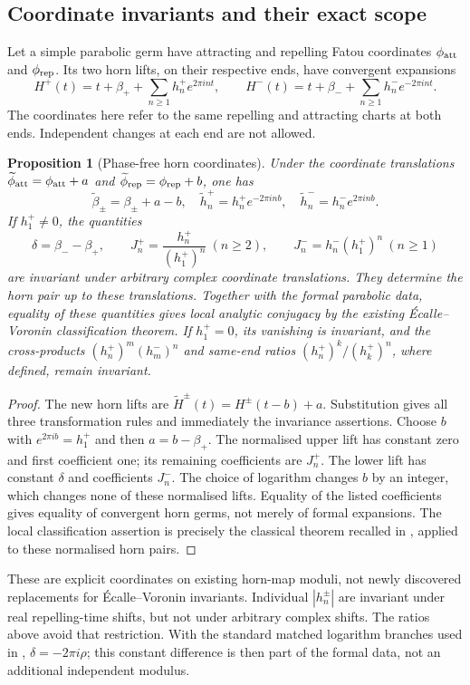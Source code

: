 \documentclass[11pt]{article}
\newtheorem{proposition}[theorem]{Proposition}
\begin{document}
\subsection{Coordinate invariants and their exact scope}
Let a simple parabolic germ have attracting and repelling Fatou
coordinates $\phi_{\rm att}$ and $\phi_{\rm rep}$. Its two horn lifts,
on their respective ends, have convergent expansions
\[
 H^+(t)=t+\beta_++\sum_{n\ge1}h_n^+e^{2\pi int},\qquad
 H^-(t)=t+\beta_-+\sum_{n\ge1}h_n^-e^{-2\pi int}.
\]
The coordinates here refer to the same repelling and attracting charts
at both ends. Independent changes at each end are not allowed.

\begin{proposition}[Phase-free horn coordinates]
\label{prop:horn-invariants}
Under the coordinate translations
$\widetilde\phi_{\rm att}=\phi_{\rm att}+a$ and
$\widetilde\phi_{\rm rep}=\phi_{\rm rep}+b$, one has
\[
 \widetilde\beta_\pm=\beta_\pm+a-b,\quad
 \widetilde h_n^+=h_n^+e^{-2\pi inb},\quad
 \widetilde h_n^-=h_n^-e^{2\pi inb}.
\]
If $h_1^+\ne0$, the quantities
\[
 \delta=\beta_--\beta_+,\qquad
 J_n^+=\frac{h_n^+}{(h_1^+)^n}\ (n\ge2),\qquad
 J_n^-=h_n^-(h_1^+)^n\ (n\ge1)
\]
are invariant under arbitrary complex coordinate translations. They
determine the horn pair up to these translations. Together with the
formal parabolic data, equality of these quantities gives local analytic
conjugacy by the existing \'Ecalle--Voronin classification theorem.
If $h_1^+=0$, its vanishing is invariant, and the cross-products
$(h_n^+)^m(h_m^-)^n$ and same-end ratios
$(h_n^+)^k/(h_k^+)^n$, where defined, remain invariant.
\end{proposition}
\begin{proof}
The new horn lifts are $\widetilde H^\pm(t)=H^\pm(t-b)+a$.
Substitution gives all three transformation rules and immediately the
invariance assertions. Choose $b$ with $e^{2\pi ib}=h_1^+$ and then
$a=b-\beta_+$. The normalised upper lift has constant zero and first
coefficient one; its remaining coefficients are $J_n^+$.
The lower lift has constant $\delta$ and coefficients $J_n^-$.
The choice of logarithm changes $b$ by an integer, which changes none
of these normalised lifts. Equality of the listed coefficients gives
equality of convergent horn germs, not merely of formal expansions.
The local classification assertion is precisely the classical theorem
recalled in \cite{DS}, applied to these normalised horn pairs.
\end{proof}
These are explicit coordinates on existing horn-map moduli, not newly
discovered replacements for \'Ecalle--Voronin invariants. Individual
$|h_n^\pm|$ are invariant under real repelling-time shifts, but not under
arbitrary complex shifts. The ratios above avoid that restriction.
With the standard matched logarithm branches used in \cite{DS},
$\delta=-2\pi i\rho$; this constant difference is then part of the
formal data, not an additional independent modulus.
\end{document}
